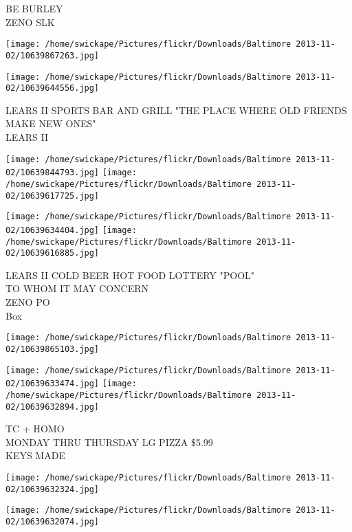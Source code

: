 \documentclass[10pt,letterpaper]{article}
\begin{document}
BE BURLEY\\
ZENO SLK\\
\pagebreak

\texttt{[image: /home/swickape/Pictures/flickr/Downloads/Baltimore 2013-11-02/10639867263.jpg]}

\vspace{0.25in}
\texttt{[image: /home/swickape/Pictures/flickr/Downloads/Baltimore 2013-11-02/10639644556.jpg]}

LEARS II SPORTS BAR AND GRILL "THE PLACE WHERE OLD FRIENDS MAKE NEW ONES"\\
LEARS II\\
\pagebreak

\texttt{[image: /home/swickape/Pictures/flickr/Downloads/Baltimore 2013-11-02/10639844793.jpg]}
\texttt{[image: /home/swickape/Pictures/flickr/Downloads/Baltimore 2013-11-02/10639617725.jpg]}

\texttt{[image: /home/swickape/Pictures/flickr/Downloads/Baltimore 2013-11-02/10639634404.jpg]}
\texttt{[image: /home/swickape/Pictures/flickr/Downloads/Baltimore 2013-11-02/10639616885.jpg]}

LEARS II COLD BEER HOT FOOD LOTTERY "POOL"\\
TO WHOM IT MAY CONCERN\\
ZENO PO\\
Box\\
\pagebreak

\texttt{[image: /home/swickape/Pictures/flickr/Downloads/Baltimore 2013-11-02/10639865103.jpg]}

\vspace{0.25in}
\texttt{[image: /home/swickape/Pictures/flickr/Downloads/Baltimore 2013-11-02/10639633474.jpg]}
\texttt{[image: /home/swickape/Pictures/flickr/Downloads/Baltimore 2013-11-02/10639632894.jpg]}

TC + HOMO\\
MONDAY THRU THURSDAY LG PIZZA \$5.99\\
KEYS MADE\\
\pagebreak

\texttt{[image: /home/swickape/Pictures/flickr/Downloads/Baltimore 2013-11-02/10639632324.jpg]}

\vspace{0.25in}
\texttt{[image: /home/swickape/Pictures/flickr/Downloads/Baltimore 2013-11-02/10639632074.jpg]}
\end{document}
